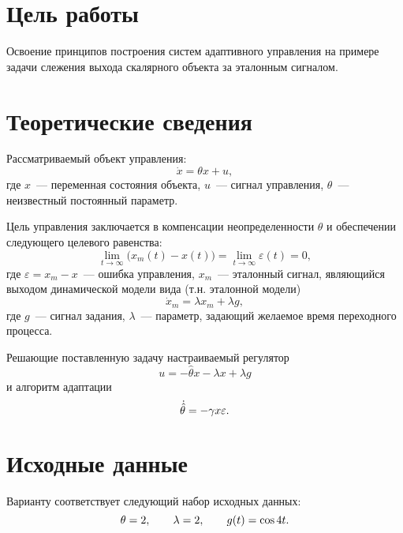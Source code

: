 \section{Цель работы}
Освоение принципов построения систем адаптивного управления на примере задачи слежения выхода скалярного объекта за эталонным сигналом.


\section{Теоретические сведения}
Рассматриваемый объект управления:
\begin{equation}
    \dot{x} = \theta x + u,
\end{equation}
где $x$~--- переменная состояния объекта, $u$~--- сигнал управления, $\theta$~--- неизвестный постоянный параметр.

Цель управления заключается в компенсации неопределенности $\theta$ и обеспечении следующего целевого равенства:
\begin{equation}\label{eq_goal_of_control}
    \lim_{t \rightarrow \infty} \bigl( x_m(t) - x(t) \bigr) = \lim_{t \rightarrow \infty} \varepsilon(t) = 0,
\end{equation}
где $\varepsilon = x_m - x$~--- ошибка управления, $x_m$~--- эталонный сигнал, являющийся выходом динамической модели вида (т.н. эталонной модели)
\begin{equation}
    \dot{x}_m = \lambda x_m + \lambda g,
\end{equation}
где $g$~--- сигнал задания, $\lambda$~--- параметр, задающий желаемое время переходного процесса.

Решающие поставленную задачу настраиваемый регулятор
\begin{equation}\label{eq_tuned_controller}
    u = -\hat{\theta} x - \lambda x + \lambda g
\end{equation}
и алгоритм адаптации
\begin{equation}\label{eq_AA}
    \dot{\hat{\theta}} = -\gamma x \varepsilon \ldotp
\end{equation}


\section{Исходные данные}
Варианту  соответствует следующий набор исходных данных:
\begin{equation}
    \theta = 2,
    \qquad
    \lambda = 2,
    \qquad
    g(t) = \cos 4t \ldotp
\end{equation}


